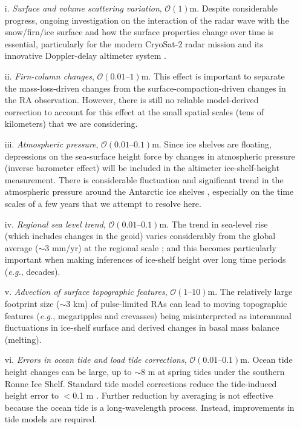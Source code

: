 \begin{itemize}
  \item[i.]     {\it Surface and volume scattering variation}, $\mathcal{O}(1) \text{m}$. Despite considerable progress, ongoing investigation on the interaction of the radar wave with the snow/firn/ice surface and how the surface properties change over time is essential, particularly for the modern CryoSat-2 radar mission and its innovative Doppler-delay altimeter system \parencite{Wingham2006}.
  \item[ii.] 	{\it Firn-column changes}, $\mathcal{O}(\text{0.01--1}) \text{m}$. This effect is important to separate the mass-loss-driven changes from the surface-compaction-driven changes in the RA observation. However, there is still no reliable model-derived correction to account for this effect at the small spatial scales (tens of kilometers) that we are considering.
  \item[iii.]   {\it Atmospheric pressure}, $\mathcal{O}(\text{0.01--0.1}) \text{m}$. Since ice shelves are floating, depressions on the sea-surface height force by changes in atmospheric pressure (inverse barometer effect) will be included in the altimeter ice-shelf-height measurement. There is considerable fluctuation and significant trend in the atmospheric pressure around the Antarctic ice shelves \parencite{Padman2003}, especially on the time scales of a few years that we attempt to resolve here.
  \item[iv.]    {\it Regional sea level trend}, $\mathcal{O}(\text{0.01--0.1}) \text{m}$. The trend in sea-level rise (which includes changes in the geoid) varies considerably from the global average ($\sim$3 mm/yr) at the regional scale \parencite{Church2004}; and this becomes particularly important when making inferences of ice-shelf height over long time periods ({\it e.g.}, decades).
  \item[v.]     {\it Advection of surface topographic features}, $\mathcal{O}(\text{1--10}) \text{m}$. The relatively large footprint size ($\sim$3 km) of pulse-limited RAs can lead to moving topographic features ({\it e.g.}, megaripples and crevasses) being misinterpreted as interannual fluctuations in ice-shelf surface and derived changes in basal mass balance (melting).
  \item[vi.]    {\it Errors in ocean tide and load tide corrections}, $\mathcal{O}(\text{0.01--0.1}) \text{m}$. Ocean tide height changes can be large, up to $\sim$8 m at spring tides under the southern Ronne Ice Shelf. Standard tide model corrections reduce the tide-induced height error to $<$0.1 m \parencite{King2005, King2011, Stammer2014}. Further reduction by averaging is not effective because the ocean tide is a long-wavelength process. Instead, improvements in tide models are required.
\end{itemize}

